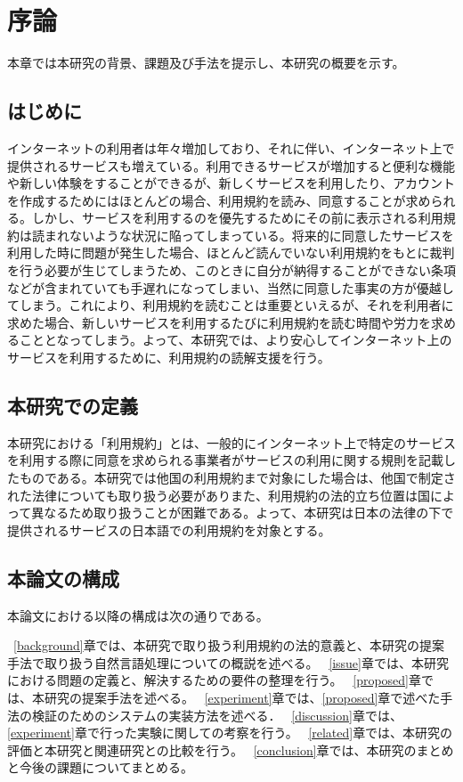 \chapter{序論}
\label{introduction}

本章では本研究の背景、課題及び手法を提示し、本研究の概要を示す。

\section{はじめに}
\label{introduction:background}
インターネットの利用者は年々増加しており、それに伴い、インターネット上で提供されるサービスも増えている。利用できるサービスが増加すると便利な機能や新しい体験をすることができるが、新しくサービスを利用したり、アカウントを作成するためにはほとんどの場合、利用規約を読み、同意することが求められる。しかし、サービスを利用するのを優先するためにその前に表示される利用規約は読まれないような状況に陥ってしまっている。将来的に同意したサービスを利用した時に問題が発生した場合、ほとんど読んでいない利用規約をもとに裁判を行う必要が生じてしまうため、このときに自分が納得することができない条項などが含まれていても手遅れになってしまい、当然に同意した事実の方が優越してしまう。これにより、利用規約を読むことは重要といえるが、それを利用者に求めた場合、新しいサービスを利用するたびに利用規約を読む時間や労力を求めることとなってしまう。よって、本研究では、より安心してインターネット上のサービスを利用するために、利用規約の読解支援を行う。

\section{本研究での定義}
本研究における「利用規約」とは、一般的にインターネット上で特定のサービスを利用する際に同意を求められる事業者がサービスの利用に関する規則を記載したものである。本研究では他国の利用規約まで対象にした場合は、他国で制定された法律についても取り扱う必要がありまた、利用規約の法的立ち位置は国によって異なるため取り扱うことが困難である。よって、本研究は日本の法律の下で提供されるサービスの日本語での利用規約を対象とする。

\section{本論文の構成}
本論文における以降の構成は次の通りである。

~\ref{background}章では、本研究で取り扱う利用規約の法的意義と、本研究の提案手法で取り扱う自然言語処理についての概説を述べる。
~\ref{issue}章では、本研究における問題の定義と、解決するための要件の整理を行う。
~\ref{proposed}章では、本研究の提案手法を述べる。
~\ref{experiment}章では、\ref{proposed}章で述べた手法の検証のためのシステムの実装方法を述べる．
~\ref{discussion}章では、\ref{experiment}章で行った実験に関しての考察を行う。
~\ref{related}章では、本研究の評価と本研究と関連研究との比較を行う。
~\ref{conclusion}章では、本研究のまとめと今後の課題についてまとめる。



